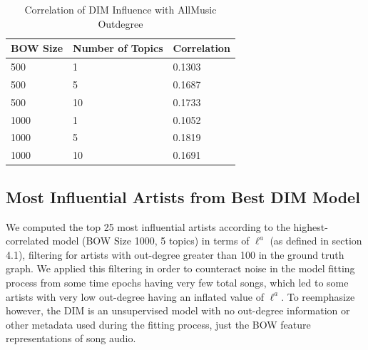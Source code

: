 \begin{table}[H]
\centering
\caption{Correlation of DIM Influence with AllMusic Outdegree}
\label{my-label}
\begin{tabular}{|l|l|l|}
\hline
BOW Size & Number of Topics & Correlation \\ \hline
500      & 1                & 0.1303        \\ \hline
500      & 5                & 0.1687      \\ \hline
500      & 10               & 0.1733    \\ \hline
1000     & 1                & 0.1052      \\ \hline
1000     & 5                & 0.1819      \\ \hline
1000     & 10               & 0.1691      \\ \hline
\end{tabular}
\end{table}

\subsection{Most Influential Artists from Best DIM Model}
We computed the top 25 most influential artists according to the highest-correlated model (BOW Size 1000, 5 topics) in terms of $\ell^a$ (as defined in section 4.1), filtering for artists with out-degree greater than 100 in the ground truth graph. We applied this filtering in order to counteract noise in the model fitting process from some time epochs having very few total songs, which led to some artists with very low out-degree having an inflated value of $\ell^a$. To reemphasize however, the DIM is an unsupervised model with no out-degree information or other metadata used during the fitting process, just the BOW feature representations of song audio.

